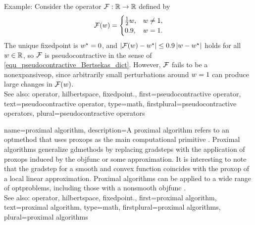 {{		Example: Consider the \gls{operator} $\mathcal{F}:\mathbb{R}\to\mathbb{R}$ defined by
		\[
			\mathcal{F}(w)=
			\begin{cases}
			\frac12 w, & w\neq 1,\\
			0.9, & w=1.
			\end{cases}
		\]
		The unique \gls{fixedpoint} is $w^\star=0$, and
		$\lvert\mathcal{F}(w)-w^\star\rvert\le
		0.9\,\lvert w-w^\star\rvert$ holds for all $w \in\mathbb{R}$,
		so $\mathcal{F}$ is pseudocontractive in the sense of \eqref{equ_pseudocontractive_Bertsekas_dict}.
		However, $\mathcal{F}$ fails to be a \gls{nonexpansiveop}, since arbitrarily small
		perturbations around $w=1$ can produce large changes in $\mathcal{F}(w)$.
		\\
		See also: \gls{operator}, \gls{hilbertspace}, \gls{fixedpoint}.},
	first={pseudocontractive operator},
	text={pseudocontractive operator},
	type=math,
	firstplural={pseudocontractive operators},
	plural={pseudocontractive operators}
}

{name={proximal algorithm},
	description={A proximal \gls{algorithm} refers to an \gls{optmethod} 
		that uses \glspl{proxop} as the main computational primitive \cite{ProximalMethods}. 
		Proximal \glspl{algorithm} generalize \glspl{gdmethod} by replacing 
		\glspl{gradstep} with the application of \glspl{proxop} induced 
		by the \gls{objfunc} or some approximation. 
		It is interesting to note that the \gls{gradstep} for a \gls{smooth} 
		and \gls{convex} \gls{function} coincides with the \gls{proxop} 
		of a local linear approximation. Proximal \glspl{algorithm} can 
		be applied to a wide range of \glspl{optproblem}, including those 
		with a \gls{nonsmooth} \gls{objfunc} \cite{ProximalMethods}.
		\\
		See also: \gls{operator}, \gls{hilbertspace}, \gls{fixedpoint}.},
	first={proximal algorithm},
	text={proximal algorithm},
	type=math,
	firstplural={proximal algorithms},
	plural={proximal algorithms}
}

